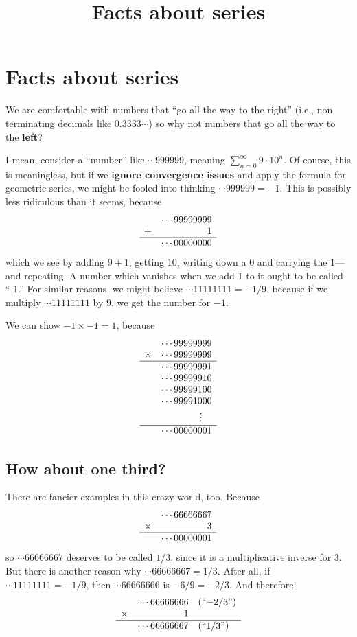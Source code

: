 \documentclass[12pt]{article}
\title{Facts about series}
\begin{document}
\section*{Facts about series}

We are comfortable with numbers that ``go all the way to the right''
(i.e., non-terminating decimals like $0.3333\cdots$) so why not
numbers that go all the way to the \textbf{left}?

I mean, consider a ``number'' like $\cdots 999999$, meaning
$\sum_{n=0}^\infty 9 \cdot 10^n$.  Of course, this is meaningless, but
if we \textbf{ignore convergence issues} and apply the formula for
geometric series, we might be fooled into thinking $\cdots 999999 =
-1$.  This is possibly less ridiculous than it seems, because
$$
\begin{array}{cr}
  & \cdots 99999999 \\
+ & 1 \\
\hline
 & \cdots  00000000
\end{array}
$$ which we see by adding $9 + 1$, getting $10$, writing down a $0$
and carrying the $1$---and repeating.  A number which vanishes when we
add $1$ to it ought to be called ``-1.''  For similar reasons, we
might believe $\cdots 11111111 = -1/9$, because if we multiply $\cdots
11111111$ by $9$, we get the number for $-1$.

We can show $-1 \times -1 = 1$, because
$$
\begin{array}{cr}
       & \cdots 99999999 \\
\times & \cdots 99999999 \\
\hline
 & \cdots 99999991 \\
 & \cdots 99999910 \\
 & \cdots 99999100 \\
 & \cdots 99991000 \\
 & \vdots \hspace{1em} \\
\hline
 & \cdots 00000001
\end{array}
$$

\subsection*{How about one third?}

There are fancier examples in this crazy world, too.  Because
$$
\begin{array}{cr}
       & \cdots 66666667 \\
\times & 3 \\
\hline
 & \cdots 00000001
\end{array}
$$ so $\cdots 66666667$ deserves to be called $1/3$, since it is a
multiplicative inverse for $3$.  But there is another reason why
$\cdots 66666667 = 1/3$.  After all, if $\cdots 11111111 = -1/9$, then
$\cdots 66666666$ is $-6/9 = -2/3$.  And therefore,
$$
\begin{array}{crl}
       & \cdots 66666666 & \mbox{(``$-2/3$'')}\\
\times & 1 \\
\hline
 & \cdots 66666667 & \mbox{(``$1/3$'')}
\end{array}
$$
\end{document}
